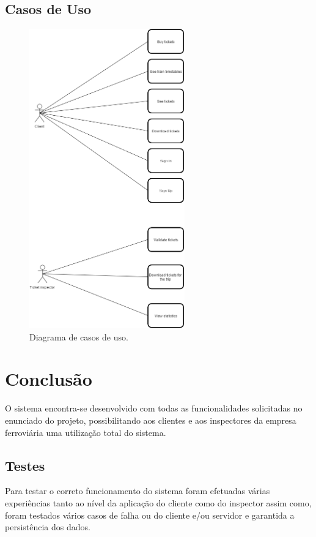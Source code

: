 \documentclass[12pt]{article}
\begin{document}
\subsection{Casos de Uso}
\begin{figure}[H]
	\centering
	\includegraphics[width=0.6\textwidth]{use.png}
	\caption{Diagrama de casos de uso.}
	\label{fig:use}
\end{figure}


\section{Conclusão}

O sistema encontra-se desenvolvido com todas as funcionalidades solicitadas no enunciado do projeto, possibilitando aos clientes e aos inspectores da empresa ferroviária uma utilização total do sistema.

\subsection*{Testes}

Para testar o correto funcionamento do sistema foram efetuadas várias experiências tanto ao nível da aplicação do cliente como do inspector assim como, foram testados vários casos de falha ou do cliente e/ou servidor e garantida a persistência dos dados.
\end{document}

